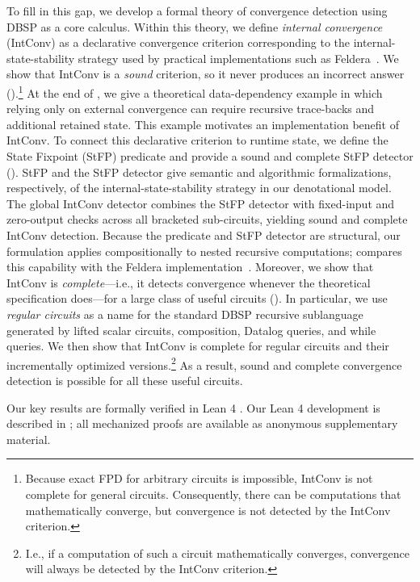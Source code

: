 To fill in this gap, we develop a formal theory of convergence detection using DBSP as a core calculus. Within this theory, we define \emph{internal convergence} (IntConv) as a declarative convergence criterion corresponding to the internal-state-stability strategy used by practical implementations such as Feldera~\cite{feldera_repo}.
We show that IntConv is a \emph{sound} criterion, so it never produces an incorrect answer ().\footnote{
  Because exact FPD for arbitrary circuits is impossible, IntConv is not complete
  for general circuits.
  Consequently, there can be computations that mathematically converge,
  but convergence is not detected by the IntConv criterion.
}
At the end of , we give a theoretical data-dependency example in which relying only on external convergence can require recursive trace-backs and additional retained state. This example motivates an implementation benefit of IntConv.
To connect this declarative criterion to runtime state, we define the State Fixpoint (StFP) predicate and provide a sound and complete StFP detector (). StFP and the StFP detector give semantic and algorithmic formalizations, respectively, of the internal-state-stability strategy in our denotational model. The global IntConv detector combines the StFP detector with fixed-input and zero-output checks across all bracketed sub-circuits, yielding sound and complete IntConv detection. Because the predicate and StFP detector are structural, our formulation applies compositionally to nested recursive computations;  compares this capability with the Feldera implementation~\cite{feldera_repo}.
Moreover, we show that IntConv is
\emph{complete}---i.e., it detects convergence whenever the theoretical specification does---for
a large class of useful circuits
(). In particular, we use \emph{regular circuits} as a name for the standard DBSP recursive sublanguage generated by lifted scalar circuits, composition, Datalog queries, and while queries. We then show that IntConv is complete for regular circuits and their incrementally optimized versions.\footnote{
  I.e., if a computation of such a circuit mathematically converges, convergence will always be detected by the IntConv criterion.
}
As a result, sound and complete convergence detection is possible for all these useful circuits.

Our key results are formally verified in Lean 4 \cite{Moura2021TheL4}.
Our Lean 4 development is described in ;
all mechanized proofs are available as anonymous supplementary material.

